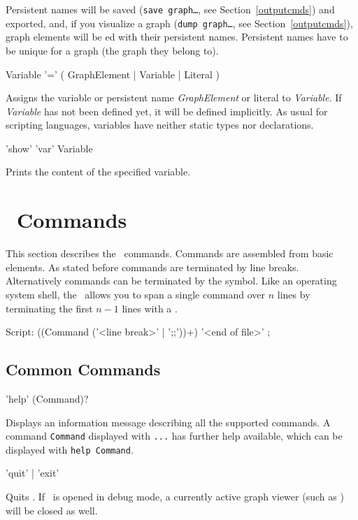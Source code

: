 \begin{note}
Persistent names will be saved (\texttt{save graph\dots}, see Section~\ref{outputcmds}) and exported, and, if you visualize a graph (\texttt{dump graph\dots}, see Section~\ref{outputcmds}), graph elements will be ed with their persistent names.
Persistent names have to be unique for a graph (the graph they belong to).
\end{note}

\begin{rail}
  Variable '=' ( GraphElement | Variable | Literal )
\end{rail}
Assigns the variable or persistent name \emph{GraphElement} or literal to \emph{Variable}. If \emph{Variable} has not been defined yet, it will be defined implicitly. As usual for scripting languages, variables have neither static types nor declarations.

\begin{rail} 
'show' 'var' Variable 
\end{rail}
Prints the content of the specified variable.


\section{\GrShell\ Commands}
This section describes the \GrShell\ commands. Commands are assembled from basic elements. 
As stated before commands are terminated by line breaks. Alternatively commands can be terminated by the \indexed{\texttt{;;}} symbol.
Like an operating system shell, the \GrShell\ allows you to span a single command over $n$ lines by terminating the first $n-1$ lines with a .  
\begin{rail}
  Script: ((Command ('<line break>' | ';;'))+) '<end of file>' ;
\end{rail}


\subsection{Common Commands}
\label{commcommands}
\begin{rail}
  'help' (Command)?
\end{rail}
Displays an information message describing all the supported commands. 
A command \texttt{Command} displayed with \texttt{...} has further help available, which can be displayed with \texttt{help Command}.

\begin{rail}
  'quit' | 'exit'
\end{rail}
Quits \GrShell. If \GrShell\ is opened in debug mode, a currently active graph viewer (such as \yComp) will be closed as well.

